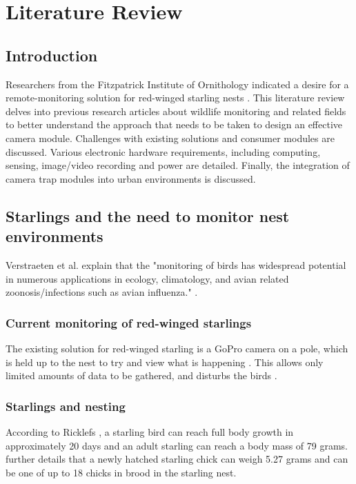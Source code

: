 \documentclass[class=report,11pt,crop=false]{standalone}
\begin{document}
\ifstandalone
\tableofcontents
\fi
\chapter{Literature Review \label{ch:literature}}

\section{Introduction}

Researchers from the Fitzpatrick Institute of Ornithology indicated a desire for a remote-monitoring solution for red-winged starling nests \cite{hofmeyer2024private}. This literature review delves into previous research articles about wildlife monitoring and related fields to better understand the approach that needs to be taken to design an effective camera module. Challenges with existing solutions and consumer modules are discussed. Various electronic hardware requirements, including computing, sensing, image/video recording and power are detailed. Finally, the integration of camera trap modules into urban environments is discussed.

\section{Starlings and the need to monitor nest environments}

Verstraeten et al. explain that the "monitoring of birds has widespread potential in numerous applications in ecology, climatology, and avian related zoonosis/infections such as avian influenza." \cite{verstraeten2010webcams}.

\subsection{Current monitoring of red-winged starlings}

The existing solution for red-winged starling is a GoPro camera on a pole, which is held up to the nest to try and view what is happening \cite{hofmeyer2024private}. This allows only limited amounts of data to be gathered, and disturbs the birds \cite{hofmeyer2024private}.

\subsection{Starlings and nesting}

According to Ricklefs \cite{ricklefs1968patterns}, a starling bird can reach full body growth in approximately 20 days and an adult starling can reach a body mass of 79 grams. \cite{ricklefs1968patterns} further details that a newly hatched starling chick can weigh 5.27 grams and can be one of up to 18 chicks in brood in the starling nest. 
\end{document}
